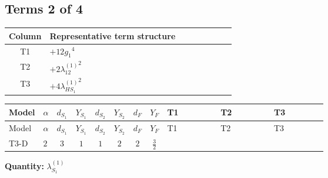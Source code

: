 \documentclass[8pt]{article}
\begin{document}
\begin{landscape}
\subsection*{Terms 2 of 4}
\begin{center}
\begin{tabular}{@{}c >{\raggedright\arraybackslash}p{0.82\linewidth}@{}}
\toprule
Column & Representative term structure \\
\midrule
T1 & \(\displaystyle +12 {g_1}^4\) \\
\midrule
T2 & \(\displaystyle +2 {\lambda_{12}^{(1)}}^2\) \\
\midrule
T3 & \(\displaystyle +4 {\lambda_{HS_1}^{(1)}}^2\) \\
\midrule
\bottomrule
\end{tabular}
\end{center}
\smallskip
\tiny
\begin{longtable}{@{}llcccccc >{\raggedright\arraybackslash}p{0.21\linewidth} >{\raggedright\arraybackslash}p{0.21\linewidth} >{\raggedright\arraybackslash}p{0.21\linewidth}@{}}
\toprule
Model & $\alpha$ & $d_{S_1}$ & $Y_{S_1}$ & $d_{S_2}$ & $Y_{S_2}$ & $d_F$ & $Y_F$ & T1 & T2 & T3 \\
\midrule
\endfirsthead
\toprule
Model & $\alpha$ & $d_{S_1}$ & $Y_{S_1}$ & $d_{S_2}$ & $Y_{S_2}$ & $d_F$ & $Y_F$ & T1 & T2 & T3 \\
\midrule
\endhead
T3-D & $2$ & $3$ & $1$ & $1$ & $2$ & $2$ & $\frac{3}{2}$ & \scriptsize\adjustbox{max width=\linewidth}{$\begin{gathered} +12 {g_1}^4\end{gathered}$} & \scriptsize\adjustbox{max width=\linewidth}{$\begin{gathered} +2 {\lambda_{12}^{(1)}}^2\end{gathered}$} & \scriptsize\adjustbox{max width=\linewidth}{$\begin{gathered} +4 {\lambda_{HS_1}^{(1)}}^2\end{gathered}$} \\
\midrule
\bottomrule
\end{longtable}
\clearpage
\noindent\textbf{Quantity: }$\lambda_{S_1}^{(1)}$\par\smallskip

\end{landscape}
\end{document}
